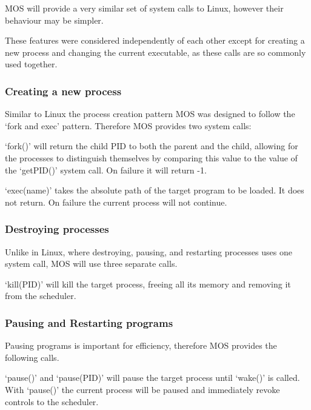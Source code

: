 \documentclass[a4paper]{report}
\begin{document}
MOS will provide a very similar set of system calls to Linux, however their behaviour may be simpler.

These features were considered independently of each other except for creating a new process and changing the current executable, as these calls are so commonly used together.

\subsubsection{Creating a new process}

Similar to Linux the process creation pattern MOS was designed to follow the `fork and exec' pattern. Therefore MOS provides two system calls:

\vspace{1.5mm}
\noindent
`fork()' will return the child PID to both the parent and the child, allowing for the processes to distinguish themselves by comparing this value to the value of the `get\textunderscore PID()' system call. On failure it will return -1.

\vspace{1.5mm}
\noindent
`exec(name)' takes the absolute path of the target program to be loaded. It does not return. On failure the current process will not continue.

\subsubsection{Destroying processes}

Unlike in Linux, where destroying, pausing, and restarting processes uses one system call, MOS will use three separate calls.

\vspace{1.5mm}
\noindent
`kill(PID)' will kill the target process, freeing all its memory and removing it from the scheduler.

\subsubsection{Pausing and Restarting programs}

Pausing programs is important for efficiency, therefore MOS provides the following calls.

\vspace{1.5mm}
\noindent
`pause()' and `pause(PID)' will pause the target process until `wake()' is called. With `pause()' the current process will be paused and immediately revoke controls to the scheduler.
\end{document}
